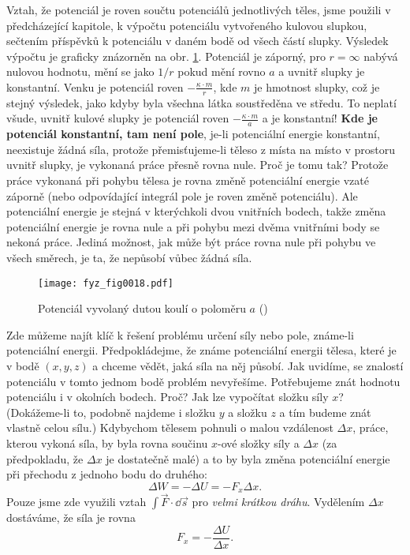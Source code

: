     Vztah, že potenciál je roven součtu potenciálů jednotlivých těles, jsme použili v předcházející 
    kapitole, k výpočtu potenciálu vytvořeného kulovou slupkou, sečtením příspěvků k 
    potenciálu v daném bodě od všech částí slupky. Výsledek výpočtu je graficky znázorněn na obr. 
    \ref{fyz:fig0018}. Potenciál je záporný, pro \(r=\infty\) nabývá nulovou hodnotu, mění se jako 
    \(1/r\) pokud mění rovno \(a\) a uvnitř slupky je konstantní. Venku je potenciál roven 
    \(-\frac{\kappa\cdot m}{r}\), kde \(m\) je hmotnost slupky, což je stejný výsledek, jako kdyby 
    byla všechna látka soustředěna ve středu. To neplatí všude, uvnitř kulové slupky je potenciál 
    roven \(-\frac{\kappa\cdot m}{a}\) a je konstantní! \textbf{Kde je potenciál konstantní, tam 
    není pole}, je-li potenciální energie konstantní, neexistuje žádná síla, protože 
    přemisťujeme-li těleso z místa na místo v prostoru uvnitř slupky, je vykonaná práce přesně 
    rovna nule. Proč je tomu tak? Protože práce vykonaná při pohybu tělesa je rovna změně 
    potenciální energie vzaté záporně (nebo odpovídající integrál pole je roven změně potenciálu). 
    Ale potenciální energie je stejná v kterýchkoli dvou vnitřních bodech, takže změna potenciální 
    energie je rovna nule a při pohybu mezi dvěma vnitřními body se nekoná práce. Jediná možnost, 
    jak může být práce rovna nule při pohybu ve všech směrech, je ta, že nepůsobí vůbec žádná síla.
    
    \begin{figure}[ht!]  %
      \centering
      \texttt{[image: fyz\_fig0018.pdf]}
      \caption{Potenciál vyvolaný dutou koulí o poloměru \(a\) (\cite[s.~205]{Feynman01})}
      \label{fyz:fig0018}
    \end{figure}    
    Zde můžeme najít klíč k řešení problému určení síly nebo pole, známe-li potenciální energii. 
    Předpokládejme, že známe potenciální energii tělesa, které je v bodě \((x, y, z)\) a chceme 
    vědět, jaká síla na něj působí. Jak uvidíme, se znalostí potenciálu v tomto jednom bodě problém 
    nevyřešíme. Potřebujeme znát hodnotu potenciálu i v okolních bodech. Proč? Jak lze vypočítat 
    složku síly \(x\)? (Dokážeme-li to, podobně najdeme i složku \(y\) a složku \(z\) a tím budeme 
    znát vlastně celou sílu.) Kdybychom tělesem pohnuli o malou vzdálenost \(\Delta x\), práce, 
    kterou vykoná síla, by byla rovna součinu \(x\)-ové složky síly a \(\Delta x\) (za předpokladu, 
    že \(\Delta x\) je dostatečně malé) a to by byla změna potenciální energie při přechodu z 
    jednoho bodu do druhého:
    \begin{equation}\label{fyz:eq004}
      \Delta W = - \Delta U = - F_x\Delta x.
    \end{equation}
    Pouze jsme zde využili vztah \(\int\vec{F}\cdot\dd{\vec{s}}\) pro \emph{velmi krátkou dráhu}. 
    Vydělením \(\Delta x\) dostáváme, že síla je rovna
    \begin{equation}\label{fyz:eq005}
      F_x = -\frac{\Delta U}{\Delta x}.
    \end{equation}
    

